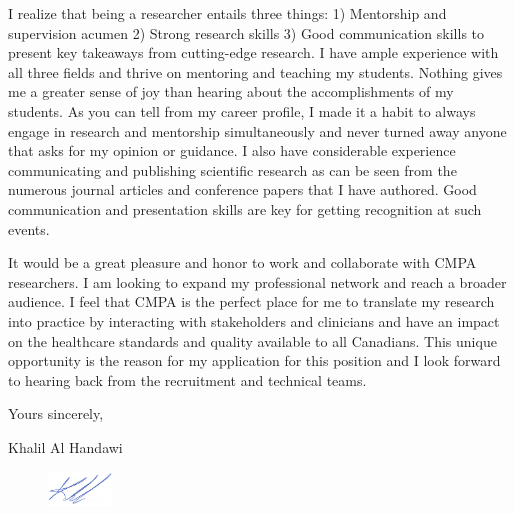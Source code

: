 \documentclass[12pt]{article} %
\begin{document}
\medskip %

I realize that being a researcher entails three things: 1) Mentorship and supervision acumen 2) Strong research skills 3) Good communication skills to present key takeaways from cutting-edge research. I have ample experience with all three fields and thrive on mentoring and teaching my students. Nothing gives me a greater sense of joy than hearing about the accomplishments of my students. As you can tell from my career profile, I made it a habit to always engage in research and mentorship simultaneously and never turned away anyone that asks for my opinion or guidance. I also have considerable experience communicating and publishing scientific research as can be seen from the numerous journal articles and conference papers that I have authored. Good communication and presentation skills are key for getting recognition at such events.

\medskip %

It would be a great pleasure and honor to work and collaborate with CMPA researchers. I am looking to expand my professional network and reach a broader audience. I feel that CMPA is the perfect place for me to translate my research into practice by interacting with stakeholders and clinicians and have an impact on the healthcare standards and quality available to all Canadians. This unique opportunity is the reason for my application for this position and I look forward to hearing back from the recruitment and technical teams.

\medskip %

Yours sincerely,

\medskip %

Khalil Al Handawi

\begin{figure}[h]
	\includegraphics[width=0.15\textwidth]{Signiture.png}
\end{figure}

\medskip %

\end{document}
